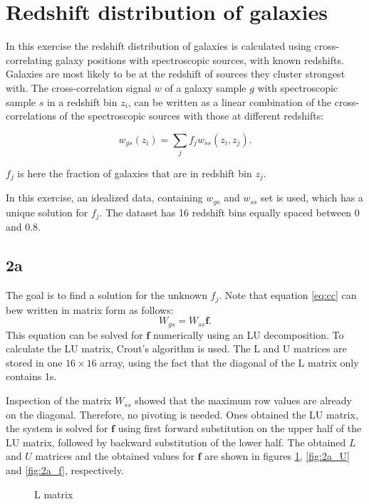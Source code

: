 \section{Redshift distribution of galaxies}
In this exercise the redshift distribution of galaxies is calculated using cross-correlating galaxy positions with spectroscopic sources, with known redshifts. Galaxies are most likely to be at the redshift of sources they cluster strongest with. The cross-correlation signal $w$ of a galaxy sample $g$ with spectroscopic sample $s$ in a redshift bin $z_i$, can be written as a linear combination of the cross-correlations of the spectroscopic sources with those at different redshifts:

\begin{equation}
    \label{eq:cc}
    w_{gs}(z_i) = \sum_j f_j w_{ss}(z_i, z_j).
\end{equation}

$f_j$ is here the fraction of galaxies that are in redshift bin $z_j$. 

In this exercise, an idealized data, containing $w_{gs}$ and $w_{ss}$ set is used, which has a unique solution for $f_j$. The dataset has 16 redshift bins equally spaced between 0 and 0.8. 

\subsection*{2a}
The goal is to find a solution for the unknown $f_j$. Note that equation \ref{eq:cc} can bew written in matrix form as follows:
\begin{equation}
    W_{gs} = W_{ss}\mathbf{f}.
\end{equation}
This equation can be solved for $\mathbf{f}$ numerically using an LU decomposition. To calculate the LU matrix, Crout's algorithm is used. The L and U matrices are stored in one $16 \times 16$ array, using the fact that the diagonal of the L matrix only contains 1s.

Inspection of the matrix $W_{ss}$ showed that the maximum row values are already on the diagonal. Therefore, no pivoting is needed. Ones obtained the LU matrix, the system is solved for $\mathbf{f}$ using first forward substitution on the upper half of the LU matrix, followed by backward substitution of the lower half. The obtained $L$ and $U$ matrices and the obtained values for $\mathbf{f}$ are shown in figures \ref{fig:2a_L}, \ref{fig:2a_U} and \ref{fig:2a_f}, respectively.

\begin{figure}[h!]
    \centering
    
    \caption{L matrix}
    \label{fig:2a_L}
\end{figure}

